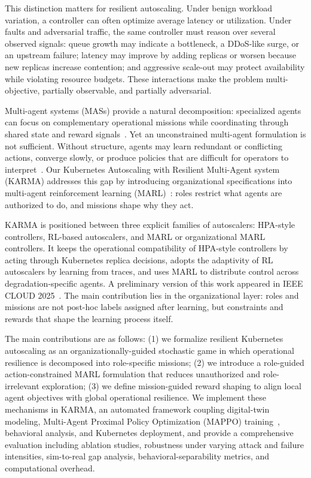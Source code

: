 \documentclass[journal]{IEEEtran}
\begin{document}
This distinction matters for resilient autoscaling. Under benign workload variation, a controller can often optimize average latency or utilization. Under faults and adversarial traffic, the same controller must reason over several observed signals: queue growth may indicate a bottleneck, a DDoS-like surge, or an upstream failure; latency may improve by adding replicas or worsen because new replicas increase contention; and aggressive scale-out may protect availability while violating resource budgets. These interactions make the problem multi-objective, partially observable, and partially adversarial.

Multi-agent systems (MASs) provide a natural decomposition: specialized agents can focus on complementary operational missions while coordinating through shared state and reward signals~\cite{Shoham2009MAS,Jennings1998}. Yet an unconstrained multi-agent formulation is not sufficient. Without structure, agents may learn redundant or conflicting actions, converge slowly, or produce policies that are difficult for operators to interpret~\cite{guidotti2018survey,garcia2015safe}. Our Kubernetes Autoscaling with Resilient Multi-Agent system (KARMA) addresses this gap by introducing organizational specifications into multi-agent reinforcement learning (MARL)~\cite{Yu2022,soule2025moisemarl}: roles restrict what agents are authorized to do, and missions shape why they act.

KARMA is positioned between three explicit families of autoscalers: HPA-style controllers, RL-based autoscalers, and MARL or organizational MARL controllers. It keeps the operational compatibility of HPA-style controllers by acting through Kubernetes replica decisions, adopts the adaptivity of RL autoscalers by learning from traces, and uses MARL to distribute control across degradation-specific agents. A preliminary version of this work appeared in IEEE CLOUD 2025~\cite{Soulée2025resilient}. The main contribution lies in the organizational layer: roles and missions are not post-hoc labels assigned after learning, but constraints and rewards that shape the learning process itself.

The main contributions are as follows: (1) we formalize resilient Kubernetes autoscaling as an organizationally-guided stochastic game in which operational resilience is decomposed into role-specific missions; (2) we introduce a role-guided action-constrained MARL formulation that reduces unauthorized and role-irrelevant exploration; (3) we define mission-guided reward shaping to align local agent objectives with global operational resilience. We implement these mechanisms in KARMA, an automated framework coupling digital-twin modeling, Multi-Agent Proximal Policy Optimization (MAPPO) training~\cite{Yu2022}, behavioral analysis, and Kubernetes deployment, and provide a comprehensive evaluation including ablation studies, robustness under varying attack and failure intensities, sim-to-real gap analysis, behavioral-separability metrics, and computational overhead.
\end{document}
